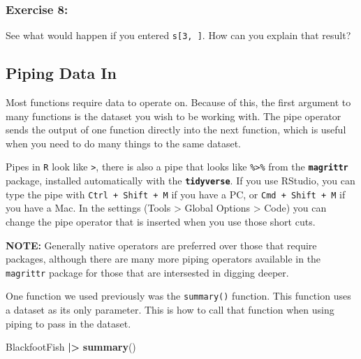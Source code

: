 \documentclass[
  10pt,
  letterpaper,
  twoside,
  openright]{book}
\newenvironment{Shaded}{\begin{snugshade}}{\end{snugshade}}
\newcommand{\FunctionTok}[1]{\textcolor[rgb]{0.13,0.29,0.53}{\textbf{#1}}}
\newcommand{\NormalTok}[1]{#1}
\newcommand{\SpecialCharTok}[1]{\textcolor[rgb]{0.81,0.36,0.00}{\textbf{#1}}}
\begin{document}
\hypertarget{exercise-8}{%
\subsubsection{Exercise 8:}\label{exercise-8}}

See what would happen if you entered \texttt{s{[}3,\ {]}}. How can you
explain that result?

\hypertarget{piping-data-in}{%
\subsection{Piping Data In}\label{piping-data-in}}

Most functions require data to operate on. Because of this, the first
argument to many functions is the dataset you wish to be working with.
The pipe operator sends the output of one function directly into the
next function, which is useful when you need to do many things to the
same dataset.

Pipes in \texttt{R} look like \texttt{\textbar{}\textgreater{}}, there
is also a pipe that looks like \texttt{\%\textgreater{}\%} from the
\textbf{\texttt{magrittr}} package, installed automatically with the
\textbf{\texttt{tidyverse}}. If you use RStudio, you can type the pipe
with \texttt{Ctrl\ +\ Shift\ +\ M} if you have a PC, or
\texttt{Cmd\ +\ Shift\ +\ M} if you have a Mac. In the settings (Tools
\textgreater{} Global Options \textgreater{} Code) you can change the
pipe operator that is inserted when you use those short cuts.

\textbf{NOTE:} Generally native operators are preferred over those that
require packages, although there are many more piping operators
available in the \texttt{magrittr} package for those that are
intersested in digging deeper.

One function we used previously was the \texttt{summary()} function.
This function uses a dataset as its only parameter. This is how to call
that function when using piping to pass in the dataset.

\begin{Shaded}
\begin{Highlighting}[]
\NormalTok{BlackfootFish }\SpecialCharTok{|\textgreater{}}
  \FunctionTok{summary}\NormalTok{()}
\end{Highlighting}
\end{Shaded}
\end{document}
